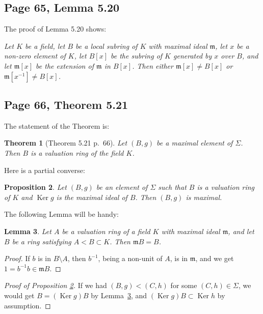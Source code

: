 \documentclass[parskip=half,fontsize=12pt]{scrartcl}%
\newcommand{\mf}{\mathfrak}
\newcommand{\mmm}{\mf m}
\newcommand{\Ker}{\operatorname{Ker}}\newcommand{\Coker}{\operatorname{Coker}}
\newtheorem{thm}{Theorem}%
\newtheorem{lem}[thm]{Lemma}
\newtheorem{prop}[thm]{Proposition}
\begin{document}
\subsection{Page 65, Lemma 5.20}\label{520}%

The proof of Lemma 5.20 shows:

\emph{Let $K$ be a field, let $B$ be a local subring of $K$ with maximal ideal $\mmm$, let $x$ be a non-zero element of $K$, let $B[x]$ be the subring of $K$ generated by $x$ over $B$, and let $\mmm[x]$ be the extension of $\mmm$ in $B[x]$. Then either $\mmm[x]\ne B[x]$ or $\mmm[x^{-1}]\ne B[x]$.}

\subsection{Page 66, Theorem 5.21}%

The statement of the Theorem is:

\begin{thm}[Theorem 5.21 p.~66]
Let $(B,g)$ be a maximal element of $\Sigma$. Then $B$ is a valuation ring of the field $K$.
\end{thm}

Here is a partial converse:

\begin{prop}\label{521}
Let $(B,g)$ be an element of $\Sigma$ such that $B$ is a valuation ring of $K$ and $\Ker g$ is the maximal ideal of $B$. Then $(B,g)$ is maximal.
\end{prop}

The following Lemma will be handy:

\begin{lem}\label{vrok}
Let $A$ be a valuation ring of a field $K$ with maximal ideal $\mmm$, and let $B$ be a ring satisfying $A<B\subset K$. Then $\mmm B=B$.
\end{lem}

\begin{proof}
If $b$ is in $B\setminus A$, then $b^{-1}$, being a non-unit of $A$, is in $\mmm$, and we get $1=b^{-1}b\in\mmm B$.
\end{proof}

\begin{proof}[Proof of Proposition \ref{521}] 
If we had $(B,g)<(C,h)$ for some $(C,h)\in\Sigma$, we would get $B=(\Ker g)B$ by Lemma~\ref{vrok}, and $(\Ker g)B\subset\Ker h$ by assumption. %
\end{proof}
\end{document}
